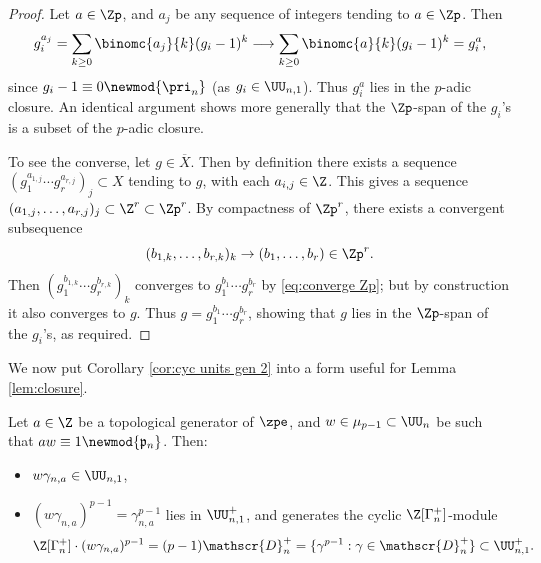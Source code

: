 \documentclass[a4paper,10pt, english, reqno]{smfart}
\numberwithin{equation}{section}
\begin{document}
\begin{proof}
Let $a \in \Zp$, and $a_j$ be any sequence of integers tending to $a \in \Zp$. Then 
\begin{equation}\label{eq:converge Zp}
    g_i^{a_j} = \sum_{k \geq 0}\binomc{a_j}{k} (g_i-1)^k \longrightarrow \sum_{k\geq 0}\binomc{a}{k}(g_i-1)^k = g_i^a,
\end{equation}
 since $g_i - 1 \equiv 0 \newmod{\pri_n}$ (as $g_i \in \UU_{n,1}$). Thus $g_i^a$ lies in the $p$-adic closure. An identical argument shows more generally that the $\Zp$-span of the $g_i$'s is a subset of the $p$-adic closure.

To see the converse, let $g \in \overline{X}$. Then by definition there exists a sequence $(g_1^{a_{1,j}}\cdots g_r^{a_{r,j}})_j \subset X$ tending to $g$, with each $a_{i,j} \in \Z$. This gives a sequence $(a_{1,j},\dots,a_{r,j})_j \subset \Z^r \subset \Zp^r$. By compactness of $\Zp^r$, there exists a convergent subsequence  
\[
    (b_{1,k},\dots,b_{r,k})_k \to (b_1, \dots, b_r) \in \Zp^r.
\]
Then $(g_1^{b_{1, k}} \cdots g_r^{b_{r, k}})_k$ converges to $g_1^{b_1} \cdots g_r^{b_r}$ by \eqref{eq:converge Zp}; but by construction it also converges to $g$. Thus $g = g_1^{b_1}\cdots g_r^{b_r}$, showing that $g$ lies in the $\Zp$-span of the $g_i$'s, as required.
\end{proof}




We now put Corollary \ref{cor:cyc units gen 2} into a form useful for Lemma \ref{lem:closure}.

\begin{lemma}\label{lem:global generators 2}
Let $a \in \Z$ be a topological generator of $\zpe$, and $w \in \mu_{p-1} \subset \UU_n$ be such that $aw \equiv 1 \newmod{\mathfrak{p}_n}$. Then:
\begin{itemize}
\item[(i)] $w\gamma_{n,a} \in \UU_{n,1}$, 
\item[(ii)] $(w\gamma_{n,a})^{p-1} = \gamma_{n,a}^{p-1}$ lies in $\UU_{n,1}^+$, and generates the cyclic $\Z[\Gamma_n^+]$-module
\[
    \Z[\Gamma_n^+]\cdot (w\gamma_{n,a})^{p-1} = (p-1)\mathscr{D}_{n}^+ = \{\gamma^{p-1} : \gamma \in \mathscr{D}_{n}^+\} \subset \UU_{n,1}^+.
\]
\end{itemize}
\end{lemma}
\end{document}
